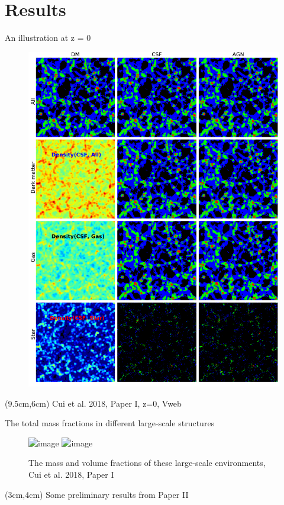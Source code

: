 \documentclass[aspectratio=43]{beamer}
\begin{document}
\section{Results}
\begin{frame}{An illustration at z = 0}
\vspace{-0.3cm}
  \begin{figure}
    \includegraphics[width=0.5\linewidth]{image_show_V}
  \end{figure}
  \begin{textblock*}{3cm}(9.5cm,6cm)
    {Cui et al. 2018, Paper I, z=0, Vweb}
  \end{textblock*}
\end{frame}

\begin{frame}{The total mass fractions in different large-scale structures}
  \begin{figure}
    \includegraphics<1>[width=\linewidth]{Fractions-BE}
    \includegraphics<2>[width=\linewidth]{Fractions-gasweb}
    \caption{The mass and volume fractions of these \newline large-scale environments, Cui et al. 2018, Paper I}
  \end{figure}
\end{frame}

\begin{frame}
  \begin{textblock*}{8cm}(3cm,4cm)
    {\Huge Some preliminary results from Paper II}
  \end{textblock*}
\end{frame}
\end{document}
